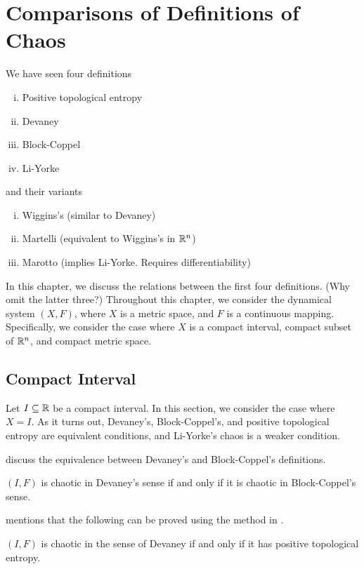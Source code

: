 \documentclass[12pt,twoside,draft]{book}
\begin{document}
\chapter{Comparisons of Definitions of Chaos}
We have seen four definitions 
\begin{enumerate}[(i)]
  \item Positive topological entropy
  \item Devaney
  \item Block-Coppel
  \item Li-Yorke
\end{enumerate}
and their variants
\begin{enumerate}[(i)]
  \item Wiggins's (similar to Devaney)
  \item Martelli (equivalent to Wiggins's in $\mathbb{R}^n$)
  \item Marotto (implies Li-Yorke. Requires differentiability)
\end{enumerate}
In this chapter, we discuss the relations between the first four definitions.
(Why omit the latter three?)
Throughout this chapter, we consider the dynamical system $(X,F)$, where $X$ is a metric space, and $F$ is a continuous mapping.
Specifically, we consider the case where $X$ is a compact interval, compact subset of $\mathbb{R}^n$, and compact metric space.


\section{Compact Interval}
Let $I \subseteq \mathbb{R}$ be a compact interval.
In this section, we consider the case where $X = I$.
As it turns out, Devaney's, Block-Coppel's, and positive topological entropy are equivalent conditions, and Li-Yorke's chaos is a weaker condition.

\citet{aulbach} discuss the equivalence between Devaney's and Block-Coppel's definitions.
\begin{theorem}
  \citep{aulbach}
  $(I,F)$ is chaotic in Devaney's sense if and only if it is chaotic in Block-Coppel's sense.
  \label{devaney-blockcoppel}
\end{theorem}

\citet{forti} mentions that the following can be proved using the method in \citet{omegachaos}.
\begin{theorem}
  $(I,F)$ is chaotic in the sense of Devaney if and only if it has positive topological entropy.
  \label{thm:devaney-entropy}
\end{theorem}
\end{document}
